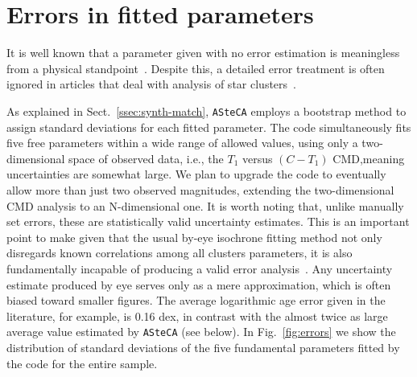 \documentclass[draft]{aa}
\begin{document}

\section{Errors in fitted parameters}
\label{sec:errors-fit}

It is well known that a parameter given with no error estimation is
meaningless from a physical standpoint~\citep{Dolphin_2002,Andrae_2010}.
%
Despite this, a detailed error treatment is often ignored in
articles that deal with analysis of star clusters~\citep{Paunzen_2006}.

As explained in Sect.~\ref{ssec:synth-match}, \texttt{ASteCA} employs a
bootstrap method to assign standard deviations for each fitted parameter.
%
The code simultaneously fits five free parameters within a wide range of allowed
values, using only a two-dimensional space of observed data, i.e., the $T_1$
versus $ (C-T_1)$ CMD,\@ meaning uncertainties are somewhat large.
We plan to upgrade the code to eventually allow more than just two observed
magnitudes, extending the two-dimensional CMD analysis to an N-dimensional one.
%
It is worth noting that, unlike manually set errors, these are
statistically valid uncertainty estimates. This is an important point to make
given that the usual by-eye isochrone fitting method not only disregards known
correlations among all clusters parameters, it is also fundamentally incapable
of producing a valid error analysis~\citep{Naylor_2006}. Any uncertainty
estimate produced by eye serves only as a mere approximation, which is often
biased toward smaller figures. The average logarithmic age error given in
the literature, for example, is 0.16 dex, in contrast with the almost twice as
large average value estimated by \texttt{ASteCA} (see below).
%
In Fig.~\ref{fig:errors} we show the distribution of standard deviations
of the five fundamental parameters fitted by the code for the entire sample.
\end{document}
